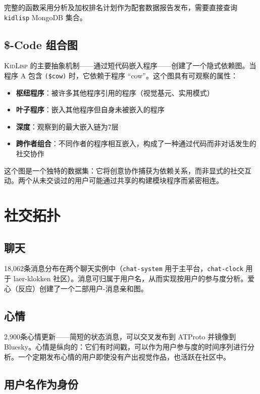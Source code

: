 \documentclass[10pt,letterpaper,twocolumn]{article}
\newcommand{\kl}{\textsc{KidLisp}}
\begin{document}
完整的函数采用分析及加权排名计划作为配套数据报告发布，需要直接查询 \texttt{kidlisp} MongoDB 集合。

\subsection{\$-Code 组合图}

\kl{} 的主要抽象机制——通过短代码嵌入程序——创建了一个隐式依赖图。当程序 A 包含 \texttt{(\$cow)} 时，它依赖于程序 ``cow''。这个图具有可观察的属性：

\begin{itemize}
  \item \textbf{枢纽程序}：被许多其他程序引用的程序（视觉基元、实用模式）
  \item \textbf{叶子程序}：嵌入其他程序但自身未被嵌入的程序
  \item \textbf{深度}：观察到的最大嵌入链为7层
  \item \textbf{跨作者组合}：不同作者的程序相互嵌入，构成了一种通过代码而非对话发生的社交协作
\end{itemize}

这个图是一个独特的数据集：它将创意协作捕获为依赖关系，而非显式的社交互动。两个从未交谈过的用户可能通过共享的构建模块程序而紧密相连。

\section{社交拓扑}

\subsection{聊天}

18,062条消息分布在两个聊天实例中（\texttt{chat-system} 用于主平台，\texttt{chat-clock} 用于 laer-klokken 社区）。消息可归属于用户名，从而实现按用户的参与度分析。爱心（反应）创建了一个二部用户-消息亲和图。

\subsection{心情}

2,900条心情更新——简短的状态消息，可以交叉发布到 ATProto 并镜像到 Bluesky。心情是纵向的：它们有时间戳，可以作为用户参与度的时间序列进行分析。一个定期发布心情的用户即使没有产出视觉作品，也活跃在社区中。

\subsection{用户名作为身份}
\end{document}
